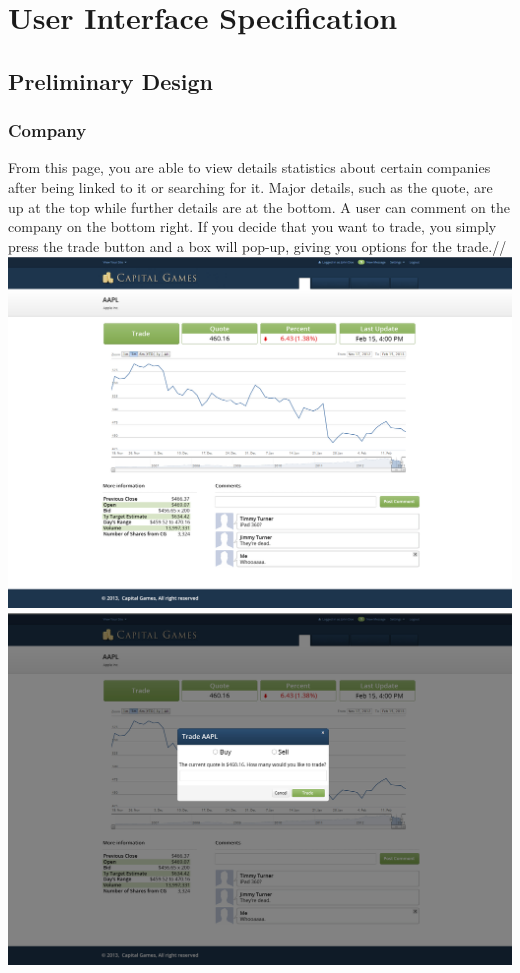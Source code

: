 \chapter{User Interface Specification}

\section{Preliminary Design}

\subsection{Company}
From this page, you are able to view details statistics about certain companies after being linked to it or searching for it. Major details, such as the quote, are up at the top while further details are at the bottom. A user can comment on the company on the bottom right. If you decide that you want to trade, you simply press the trade button and a box will pop-up, giving you options for the trade.//
\includegraphics{./mockups/JPEG/company.jpg}
\includegraphics{./mockups/JPEG/Trade_popup.jpg}

